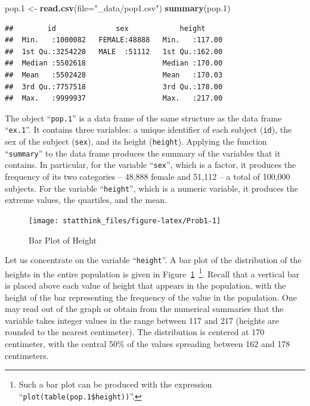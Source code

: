 \documentclass[]{krantz}
\makeatletter
\newenvironment{Shaded}{\begin{snugshade}}{\end{snugshade}}
\newcommand{\KeywordTok}[1]{\textcolor[rgb]{0.13,0.29,0.53}{\textbf{#1}}}
\newcommand{\DataTypeTok}[1]{\textcolor[rgb]{0.13,0.29,0.53}{#1}}
\newcommand{\DecValTok}[1]{\textcolor[rgb]{0.00,0.00,0.81}{#1}}
\newcommand{\StringTok}[1]{\textcolor[rgb]{0.31,0.60,0.02}{#1}}
\newcommand{\NormalTok}[1]{#1}
\newenvironment{kframe}{%
\medskip{}
\setlength{\fboxsep}{.8em}
 \def\at@end@of@kframe{}%
 \ifinner\ifhmode%
  \def\at@end@of@kframe{\end{minipage}}%
  \begin{minipage}{\columnwidth}%
 \fi\fi%
 \def\FrameCommand##1{\hskip\@totalleftmargin \hskip-\fboxsep
 \colorbox{shadecolor}{##1}\hskip-\fboxsep
     \hskip-\linewidth \hskip-\@totalleftmargin \hskip\columnwidth}%
 \MakeFramed {\advance\hsize-\width
   \@totalleftmargin\z@ \linewidth\hsize
   \@setminipage}}%
 {\par\unskip\endMakeFramed%
 \at@end@of@kframe}
\renewenvironment{Shaded}{\begin{kframe}}{\end{kframe}}
\theoremstyle{definition}
\theoremstyle{definition}
\theoremstyle{definition}
\theoremstyle{remark}
\makeatother
\begin{document}
\begin{Shaded}
\begin{Highlighting}[]
\NormalTok{pop.}\DecValTok{1}\NormalTok{ <-}\StringTok{ }\KeywordTok{read.csv}\NormalTok{(}\DataTypeTok{file=}\StringTok{"_data/pop1.csv"}\NormalTok{)}
\KeywordTok{summary}\NormalTok{(pop.}\DecValTok{1}\NormalTok{)}
\end{Highlighting}
\end{Shaded}

\begin{verbatim}
##        id              sex            height      
##  Min.   :1000082   FEMALE:48888   Min.   :117.00  
##  1st Qu.:3254220   MALE  :51112   1st Qu.:162.00  
##  Median :5502618                  Median :170.00  
##  Mean   :5502428                  Mean   :170.03  
##  3rd Qu.:7757518                  3rd Qu.:178.00  
##  Max.   :9999937                  Max.   :217.00
\end{verbatim}

The object ``\texttt{pop.1}'' is a data frame of the same structure as
the data frame ``\texttt{ex.1}''. It contains three variables: a unique
identifier of each subject (\texttt{id}), the sex of the subject
(\texttt{sex}), and its height (\texttt{height}). Applying the function
``\texttt{summary}'' to the data frame produces the summary of the
variables that it contains. In particular, for the variable
``\texttt{sex}'', which is a factor, it produces the frequency of its
two categories -- 48,888 female and 51,112 -- a total of 100,000
subjects. For the variable ``\texttt{height}'', which is a numeric
variable, it produces the extreme values, the quartiles, and the mean.

\begin{figure}

{\centering \texttt{[image: statthink\_files/figure-latex/Prob1-1]} 

}

\caption{Bar Plot of Height}\label{fig:Prob1}
\end{figure}

Let us concentrate on the variable ``\texttt{height}''. A bar plot of
the distribution of the heights in the entire population is given in
Figure~\ref{fig:Prob1}~\footnote{Such a bar plot can be produced with
  the expression ``\texttt{plot(table(pop.1\$height))}''.}. Recall that
a vertical bar is placed above each value of height that appears in the
population, with the height of the bar representing the frequency of the
value in the population. One may read out of the graph or obtain from
the numerical summaries that the variable takes integer values in the
range between 117 and 217 (heights are rounded to the nearest
centimeter). The distribution is centered at 170 centimeter, with the
central 50\% of the values spreading between 162 and 178 centimeters.
\end{document}
